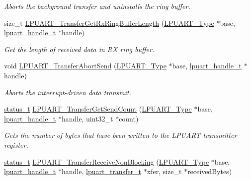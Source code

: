 \begin{DoxyCompactItemize}
\begin{DoxyCompactList}\small\item\em Aborts the background transfer and uninstalls the ring buffer. \end{DoxyCompactList}\item 
size\+\_\+t \mbox{\hyperlink{group__lpuart__driver_ga550523d301acfa413919c2f979228bcc}{L\+P\+U\+A\+R\+T\+\_\+\+Transfer\+Get\+Rx\+Ring\+Buffer\+Length}} (\mbox{\hyperlink{struct_l_p_u_a_r_t___type}{L\+P\+U\+A\+R\+T\+\_\+\+Type}} $\ast$base, \mbox{\hyperlink{struct__lpuart__handle}{lpuart\+\_\+handle\+\_\+t}} $\ast$handle)
\begin{DoxyCompactList}\small\item\em Get the length of received data in RX ring buffer. \end{DoxyCompactList}\item 
void \mbox{\hyperlink{group__lpuart__driver_ga6dfe9efe9656e126c70ee79fa03f2be3}{L\+P\+U\+A\+R\+T\+\_\+\+Transfer\+Abort\+Send}} (\mbox{\hyperlink{struct_l_p_u_a_r_t___type}{L\+P\+U\+A\+R\+T\+\_\+\+Type}} $\ast$base, \mbox{\hyperlink{struct__lpuart__handle}{lpuart\+\_\+handle\+\_\+t}} $\ast$handle)
\begin{DoxyCompactList}\small\item\em Aborts the interrupt-\/driven data transmit. \end{DoxyCompactList}\item 
\mbox{\hyperlink{group__ksdk__common_gaaabdaf7ee58ca7269bd4bf24efcde092}{status\+\_\+t}} \mbox{\hyperlink{group__lpuart__driver_gad80d2469dce0de9361e731e4cefde9fd}{L\+P\+U\+A\+R\+T\+\_\+\+Transfer\+Get\+Send\+Count}} (\mbox{\hyperlink{struct_l_p_u_a_r_t___type}{L\+P\+U\+A\+R\+T\+\_\+\+Type}} $\ast$base, \mbox{\hyperlink{struct__lpuart__handle}{lpuart\+\_\+handle\+\_\+t}} $\ast$handle, uint32\+\_\+t $\ast$count)
\begin{DoxyCompactList}\small\item\em Gets the number of bytes that have been written to the L\+P\+U\+A\+RT transmitter register. \end{DoxyCompactList}\item 
\mbox{\hyperlink{group__ksdk__common_gaaabdaf7ee58ca7269bd4bf24efcde092}{status\+\_\+t}} \mbox{\hyperlink{group__lpuart__driver_ga8bdb584704ce7955004751e32627f918}{L\+P\+U\+A\+R\+T\+\_\+\+Transfer\+Receive\+Non\+Blocking}} (\mbox{\hyperlink{struct_l_p_u_a_r_t___type}{L\+P\+U\+A\+R\+T\+\_\+\+Type}} $\ast$base, \mbox{\hyperlink{struct__lpuart__handle}{lpuart\+\_\+handle\+\_\+t}} $\ast$handle, \mbox{\hyperlink{group__lpuart__driver_ga1d4707ebc5d49dd655eedb7e5acd27fd}{lpuart\+\_\+transfer\+\_\+t}} $\ast$xfer, size\+\_\+t $\ast$received\+Bytes)

\end{DoxyCompactItemize}
